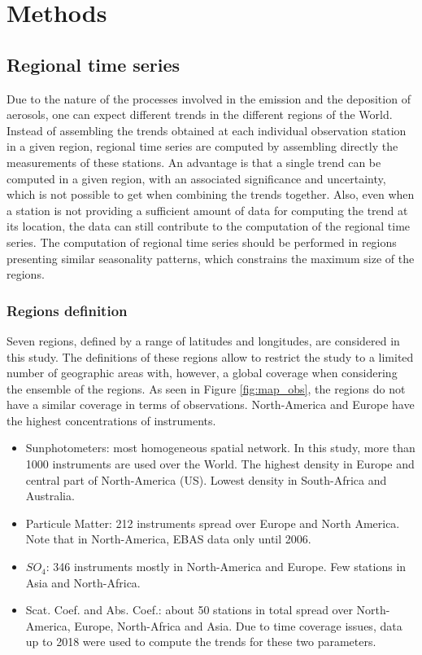 \documentclass[journal abbreviation, manuscript]{copernicus}
\begin{document}
\section{Methods}

\subsection{Regional time series}
Due to the nature of the processes involved in the emission and the deposition of aerosols, one can expect different trends in the different regions of the World.
Instead of assembling the trends obtained at each individual observation station in a given region, regional time series are computed by assembling directly the measurements of these stations. An advantage is that a single trend can be computed in a given region, with an associated significance and uncertainty, which is not possible to get when combining the trends together. Also, even when a station is not providing a sufficient amount of data for computing the trend at its location, the data can still contribute to the computation of the regional time series. The computation of regional time series should be performed in regions presenting similar seasonality patterns, which constrains the maximum size of the regions.

\subsubsection{Regions definition}
Seven regions, defined by a range of latitudes and longitudes, are considered in this study. The definitions of these regions allow to restrict the study to a limited number of geographic areas with, however, a global coverage when considering the ensemble of the regions. As seen in Figure \ref{fig:map_obs}, the regions do not have a similar coverage in terms of observations. North-America and Europe have the highest concentrations of instruments.
\begin{itemize}
 \item Sunphotometers: most homogeneous spatial network. In this study, more than 1000 instruments are used over the World. The highest density in Europe and central part of North-America (US). Lowest density in South-Africa and Australia.
 \item Particule Matter: 212 instruments spread over Europe and North America. Note that in North-America, EBAS data only until 2006.
 \item $SO_{4}$: 346 instruments mostly in North-America and Europe. Few stations in Asia and North-Africa.
 \item Scat. Coef. and Abs. Coef.: about 50 stations in total spread over North-America, Europe, North-Africa and Asia. Due to time coverage issues, data up to 2018 were used to compute the trends for these two parameters.
\end{itemize}
\end{document}
